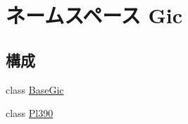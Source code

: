 \hypertarget{namespaceGic}{
\section{ネームスペース Gic}
\label{namespaceGic}
}
\subsection*{構成}
\begin{DoxyCompactItemize}
\item 
class \hyperlink{classGic_1_1BaseGic}{BaseGic}
\item 
class \hyperlink{classGic_1_1Pl390}{Pl390}
\end{DoxyCompactItemize}
